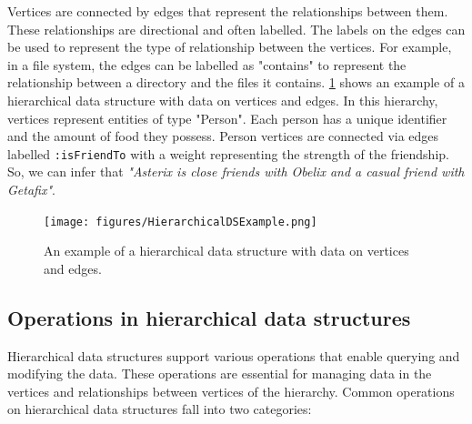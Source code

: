 Vertices are connected by edges that represent the relationships between them. These relationships are directional and often labelled. The labels on the edges can be used to represent the type of relationship between the vertices. For example, in a file system, the edges can be labelled as "contains" to represent the relationship between a directory and the files it contains. \cref{fig:hierarchicalDS} shows an example of a hierarchical data structure with data on vertices and edges. In this hierarchy, vertices represent entities of type "Person". Each person has a unique identifier and the amount of food they possess. Person vertices are connected via edges labelled \texttt{:isFriendTo} with a weight representing the strength of the friendship. So, we can infer that \emph{"Asterix is close friends with Obelix and a casual friend with Getafix"}.


\begin{figure}[h]
    \centering
    \captionsetup{justification=centering}
    \texttt{[image: figures/HierarchicalDSExample.png]}
    \caption{An example of a hierarchical data structure with data on vertices and edges.}
    \label{fig:hierarchicalDS}
\end{figure}




\subsection{Operations in hierarchical data structures}

Hierarchical data structures support various operations that enable querying and modifying the data. These operations are essential for managing data in the vertices and relationships between vertices of the hierarchy. Common operations on hierarchical data structures fall into two categories:

